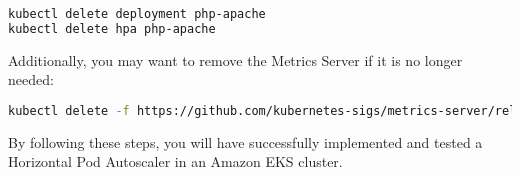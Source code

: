 \begin{lstlisting}[language=bash]
kubectl delete deployment php-apache
kubectl delete hpa php-apache
\end{lstlisting}

Additionally, you may want to remove the Metrics Server if it is no longer needed:

\begin{lstlisting}[language=bash]
kubectl delete -f https://github.com/kubernetes-sigs/metrics-server/releases/latest/download/components.yaml
\end{lstlisting}

By following these steps, you will have successfully implemented and tested a Horizontal Pod Autoscaler in an Amazon EKS cluster.
